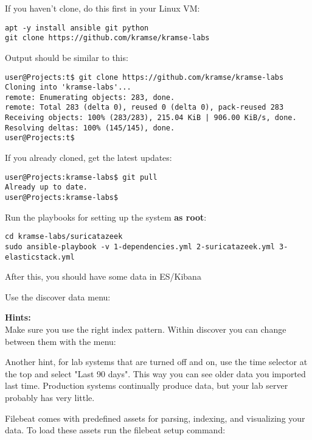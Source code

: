 \documentclass[a4paper,11pt,notitlepage]{report}
\begin{document}

If you haven't clone, do this first in your Linux VM:
\begin{verbatim}
apt -y install ansible git python
git clone https://github.com/kramse/kramse-labs
\end{verbatim}

Output should be similar to this:
\begin{verbatim}
user@Projects:t$ git clone https://github.com/kramse/kramse-labs
Cloning into 'kramse-labs'...
remote: Enumerating objects: 283, done.
remote: Total 283 (delta 0), reused 0 (delta 0), pack-reused 283
Receiving objects: 100% (283/283), 215.04 KiB | 906.00 KiB/s, done.
Resolving deltas: 100% (145/145), done.
user@Projects:t$
\end{verbatim}

If you already cloned, get the latest updates:
\begin{verbatim}
user@Projects:kramse-labs$ git pull
Already up to date.
user@Projects:kramse-labs$
\end{verbatim}

Run the playbooks for setting up the system {\bf as root}:
\begin{verbatim}
cd kramse-labs/suricatazeek
sudo ansible-playbook -v 1-dependencies.yml 2-suricatazeek.yml 3-elasticstack.yml
\end{verbatim}

After this, you should have some data in ES/Kibana

Use the discover data menu:


{\bf Hints:}\\
Make sure you use the right index pattern. Within discover you can change between them with the menu:


Another hint, for lab systems that are turned off and on, use the time selector at the top and select "Last 90 days". This way you can see older data you imported last time. Production systems continually produce data, but your lab server probably has very little.


Filebeat comes with predefined assets for parsing, indexing, and visualizing your data. To load these assets run the filebeat setup command:
\end{document}
